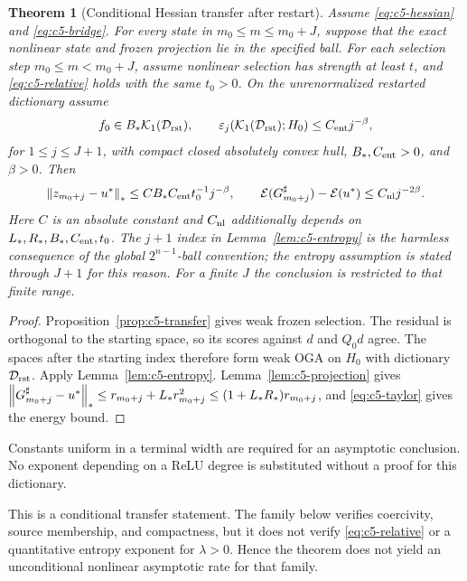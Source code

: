 \documentclass[11pt]{article}
\newtheorem{theorem}{Theorem}[section]
\theoremstyle{remark}
\begin{document}
\begin{theorem}[Conditional Hessian transfer after restart]
\label{thm:c5-hessian}
Assume \eqref{eq:c5-hessian} and \eqref{eq:c5-bridge}.
For every state in $m_0\leq m\leq m_0+J$, suppose that the exact nonlinear
state and frozen projection lie in the specified ball.
For each selection step $m_0\leq m<m_0+J$, assume nonlinear selection
has strength at least $t$, and \eqref{eq:c5-relative} holds with
the same $t_0>0$. On the unrenormalized restarted dictionary assume
\begin{equation}
 f_0\in B_*\mathcal K_1(\mathcal D_{\rm rst}),\qquad
 \varepsilon_j(\mathcal K_1(\mathcal D_{\rm rst});H_0)\leq C_{\rm ent}j^{-\beta},
 \label{eq:c5-source-entropy}
\end{equation}
for $1\leq j\leq J+1$, with compact closed absolutely convex hull,
$B_*,C_{\rm ent}>0$, and $\beta>0$.
Then
\[
 \left\lVert z_{m_0+j}-u^*\right\rVert_*\leq
 C B_*C_{\rm ent}t_0^{-1}j^{-\beta},\qquad
 \mathcal E(G_{m_0+j}^\sharp)-\mathcal E(u^*)\leq C_{\rm nl}j^{-2\beta}.
\]
Here $C$ is an absolute constant and $C_{\rm nl}$ additionally depends
on $L_*,R_*,B_*,C_{\rm ent},t_0$. The \(j+1\) index in
Lemma~\ref{lem:c5-entropy} is the harmless consequence of the global
\(2^{n-1}\)-ball convention; the entropy assumption is stated through
\(J+1\) for this reason. For a finite $J$ the conclusion is restricted to
that finite range.
\end{theorem}
\begin{proof}
Proposition~\ref{prop:c5-transfer} gives weak frozen selection.
The residual is orthogonal to the starting space, so its scores against
$d$ and $Q_0d$ agree. The spaces after the starting index therefore form weak OGA
on $H_0$ with dictionary $\mathcal D_{\rm rst}$. Apply
Lemma~\ref{lem:c5-entropy}. Lemma~\ref{lem:c5-projection} gives
$\left\lVert G_{m_0+j}^\sharp-u^*\right\rVert_*
\leq r_{m_0+j}+L_*r_{m_0+j}^2
\leq(1+L_*R_*)r_{m_0+j}$, and \eqref{eq:c5-taylor}
gives the energy bound.
\end{proof}
Constants uniform in a terminal width are required for an asymptotic
conclusion. No exponent depending on a ReLU degree is substituted
without a proof for this dictionary.

This is a conditional transfer statement. The family below verifies
coercivity, source membership, and compactness, but it does not verify
\eqref{eq:c5-relative} or a quantitative entropy exponent for
\(\lambda>0\). Hence the theorem does not yield an unconditional nonlinear
asymptotic rate for that family.
\end{document}
